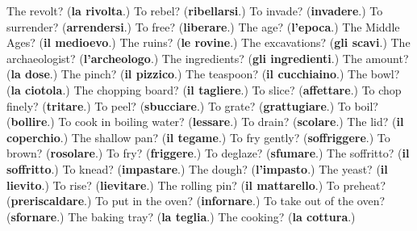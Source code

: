 \begin{tcolorbox}[breakable,colback=teal!4,colframe=teal!35!black,title={Before you move on}]
The revolt? (\textbf{la rivolta}.) To rebel? (\textbf{ribellarsi}.) To invade? (\textbf{invadere}.) To surrender? (\textbf{arrendersi}.) To free? (\textbf{liberare}.) The age? (\textbf{l'epoca}.) The Middle Ages? (\textbf{il medioevo}.) The ruins? (\textbf{le rovine}.) The excavations? (\textbf{gli scavi}.) The archaeologist? (\textbf{l'archeologo}.) The ingredients? (\textbf{gli ingredienti}.) The amount? (\textbf{la dose}.) The pinch? (\textbf{il pizzico}.) The teaspoon? (\textbf{il cucchiaino}.) The bowl? (\textbf{la ciotola}.) The chopping board? (\textbf{il tagliere}.) To slice? (\textbf{affettare}.) To chop finely? (\textbf{tritare}.) To peel? (\textbf{sbucciare}.) To grate? (\textbf{grattugiare}.) To boil? (\textbf{bollire}.) To cook in boiling water? (\textbf{lessare}.) To drain? (\textbf{scolare}.) The lid? (\textbf{il coperchio}.) The shallow pan? (\textbf{il tegame}.) To fry gently? (\textbf{soffriggere}.) To brown? (\textbf{rosolare}.) To fry? (\textbf{friggere}.) To deglaze? (\textbf{sfumare}.) The soffritto? (\textbf{il soffritto}.) To knead? (\textbf{impastare}.) The dough? (\textbf{l'impasto}.) The yeast? (\textbf{il lievito}.) To rise? (\textbf{lievitare}.) The rolling pin? (\textbf{il mattarello}.) To preheat? (\textbf{preriscaldare}.) To put in the oven? (\textbf{infornare}.) To take out of the oven? (\textbf{sfornare}.) The baking tray? (\textbf{la teglia}.) The cooking? (\textbf{la cottura}.)
\end{tcolorbox}
